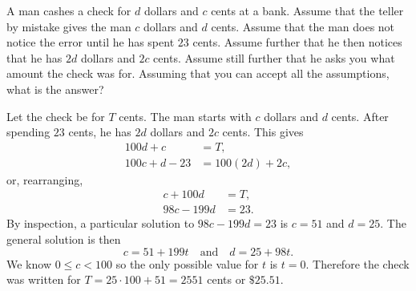  A man cashes a check for $d$ dollars and $c$ cents at a
bank. Assume that the teller by mistake gives the man $c$ dollars and
$d$ cents. Assume that the man does not notice the error until he has
spent $23$ cents. Assume further that he then notices that he has $2d$
dollars and $2c$ cents. Assume still further that he asks you what
amount the check was for. Assuming that you can accept all the
assumptions, what is the answer?
\begin{solution}
  Let the check be for $T$ cents. The man starts with $c$ dollars and
  $d$ cents. After spending $23$ cents, he has $2d$ dollars and $2c$
  cents. This gives
  \begin{align*}
    100d + c &= T, \\
    100c + d - 23 &= 100(2d) + 2c,
  \end{align*}
  or, rearranging,
  \begin{align*}
    c + 100d &= T, \\
    98c - 199d &= 23.
  \end{align*}
  By inspection, a particular solution to $98c - 199d = 23$ is
  $c = 51$ and $d = 25$. The general solution is then
  \begin{equation*}
    c = 51 + 199t \quad\text{and}\quad d = 25 + 98t.
  \end{equation*}
  We know $0\leq c<100$ so the only possible value for $t$ is $t =
  0$. Therefore the check was written for $T = 25\cdot100 + 51 = 2551$
  cents or $\$25.51$.
\end{solution}
